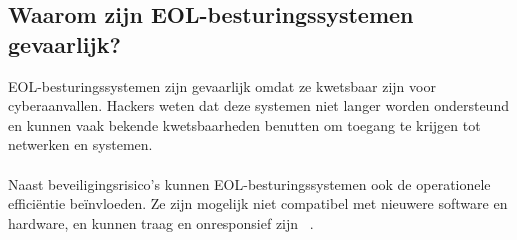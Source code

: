 \subsection{Waarom zijn EOL-besturingssystemen gevaarlijk?}
EOL-besturingssystemen zijn gevaarlijk omdat ze kwetsbaar zijn voor cyberaanvallen. 
Hackers weten dat deze systemen niet langer worden ondersteund en kunnen vaak bekende kwetsbaarheden benutten om toegang te krijgen tot netwerken en systemen.
\\\\
Naast beveiligingsrisico's kunnen EOL-besturingssystemen ook de operationele efficiëntie beïnvloeden.
Ze zijn mogelijk niet compatibel met nieuwere software en hardware, en kunnen traag en onresponsief zijn ~\autocite{Mittal2024}.


